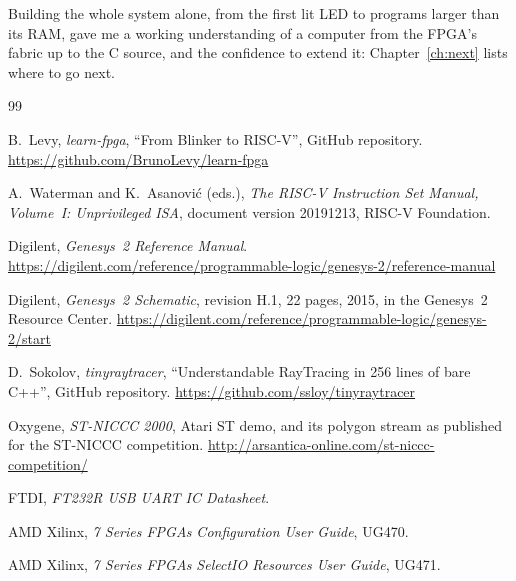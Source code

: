 \documentclass[11pt,a4paper]{report}
\begin{document}
Building the whole system alone, from the first lit LED to programs larger than its RAM, gave
me a working understanding of a computer from the FPGA's fabric up to the C source, and the
confidence to extend it: Chapter~\ref{ch:next} lists where to go next.

\begin{thebibliography}{99}
\raggedright  %

B.~Levy, \emph{learn-fpga}, ``From Blinker to RISC-V'', GitHub repository.
\url{https://github.com/BrunoLevy/learn-fpga}

A.~Waterman and K.~Asanovi\'c (eds.), \emph{The RISC-V Instruction Set Manual, Volume~I:
Unprivileged ISA}, document version 20191213, RISC-V Foundation.

Digilent, \emph{Genesys~2 Reference Manual}.
\url{https://digilent.com/reference/programmable-logic/genesys-2/reference-manual}

Digilent, \emph{Genesys~2 Schematic}, revision H.1, 22 pages, 2015, in the Genesys~2 Resource
Center. \url{https://digilent.com/reference/programmable-logic/genesys-2/start}

D.~Sokolov, \emph{tinyraytracer}, ``Understandable RayTracing in 256 lines of bare C++'',
GitHub repository. \url{https://github.com/ssloy/tinyraytracer}

Oxygene, \emph{ST-NICCC 2000}, Atari ST demo, and its polygon stream as published for the
ST-NICCC competition. \url{http://arsantica-online.com/st-niccc-competition/}

FTDI, \emph{FT232R USB UART IC Datasheet}.

AMD Xilinx, \emph{7 Series FPGAs Configuration User Guide}, UG470.

AMD Xilinx, \emph{7 Series FPGAs SelectIO Resources User Guide}, UG471.

\end{thebibliography}
\end{document}
